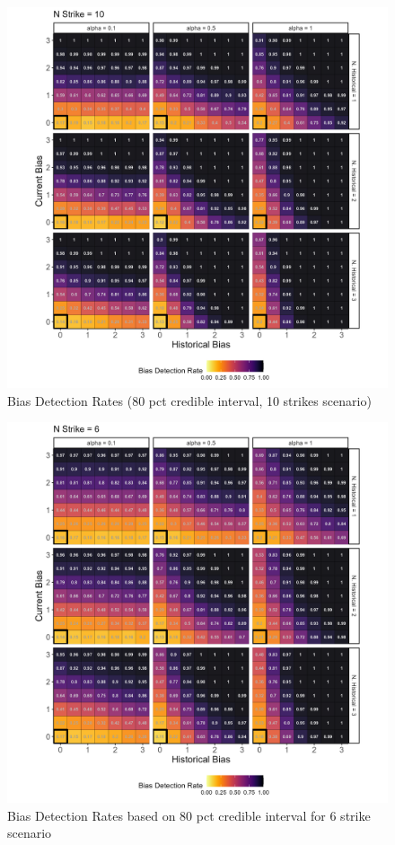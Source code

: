 \documentclass[12pt]{article}
\begin{document}
\begin{figure}

{\centering \includegraphics[width=0.95\linewidth]{../figures/pp10_80CI} 

}

\caption{Bias Detection Rates (80 pct credible interval, 10 strikes scenario)}\label{fig:figbd8010}
\end{figure}

\begin{figure}

{\centering \includegraphics[width=0.95\linewidth]{../figures/pp6_80CI} 

}

\caption{Bias Detection Rates based on 80 pct credible interval for 6 strike scenario}\label{fig:figbd806}
\end{figure}
\end{document}
